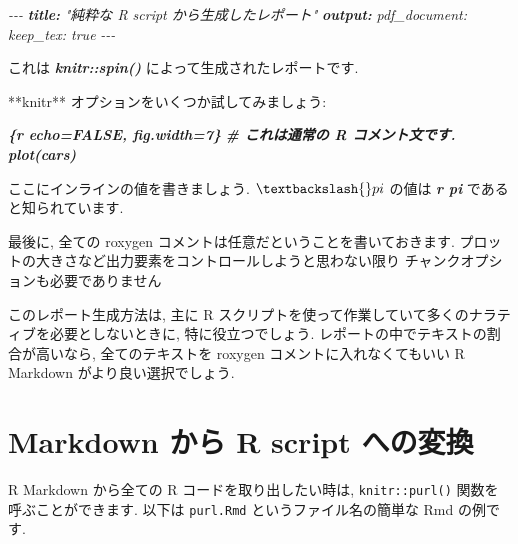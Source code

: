 \documentclass[
  11pt,
  lualatex,ja=standard,jafont=noto]{bxjsreport}
\newenvironment{Shaded}{\begin{snugshade}}{\end{snugshade}}
\newcommand{\AnnotationTok}[1]{\textcolor[rgb]{0.56,0.35,0.01}{\textbf{\textit{#1}}}}
\newcommand{\CommentTok}[1]{\textcolor[rgb]{0.56,0.35,0.01}{\textit{#1}}}
\newcommand{\InformationTok}[1]{\textcolor[rgb]{0.56,0.35,0.01}{\textbf{\textit{#1}}}}
\newcommand{\NormalTok}[1]{#1}
\begin{document}
\begin{Shaded}
\begin{Highlighting}[]
\CommentTok{{-}{-}{-}}
\AnnotationTok{title:}\CommentTok{ "純粋な R script から生成したレポート"}
\AnnotationTok{output:}
\CommentTok{  pdf\_document:}
\CommentTok{    keep\_tex: true}
\CommentTok{{-}{-}{-}}

\NormalTok{これは }\InformationTok{\textasciigrave{}knitr::spin()\textasciigrave{}}\NormalTok{ によって生成されたレポートです.}

\NormalTok{**knitr** オプションをいくつか試してみましょう:}

\InformationTok{\textasciigrave{}\textasciigrave{}\textasciigrave{}\{r echo=FALSE, fig.width=7\}}
\InformationTok{\#  これは通常の R コメント文です.}
\InformationTok{plot(cars)}
\InformationTok{\textasciigrave{}\textasciigrave{}\textasciigrave{}}

\NormalTok{ここにインラインの値を書きましょう. $\textbackslash{}pi$ の値は}
\InformationTok{\textasciigrave{}\textasciigrave{}r  pi  \textasciigrave{}\textasciigrave{}}
\NormalTok{であると知られています.}

\NormalTok{最後に, 全ての roxygen コメントは任意だということを書いておきます.}
\NormalTok{プロットの大きさなど出力要素をコントロールしようと思わない限り}
\NormalTok{チャンクオプションも必要でありません}
\end{Highlighting}
\end{Shaded}

このレポート生成方法は, 主に R スクリプトを使って作業していて多くのナラティブを必要としないときに, 特に役立つでしょう. レポートの中でテキストの割合が高いなら, 全てのテキストを roxygen コメントに入れなくてもいい R Markdown がより良い選択でしょう.

\hypertarget{purl}{%
\section{Markdown から R script への変換}\label{purl}}

R Markdown から全ての R コードを取り出したい時は, \texttt{knitr::purl()} 関数を呼ぶことができます. 以下は \texttt{purl.Rmd} というファイル名の簡単な Rmd の例です.
\end{document}

